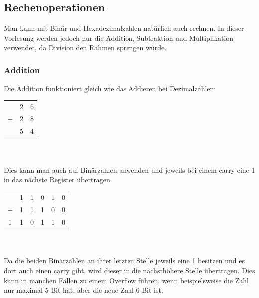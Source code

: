 \documentclass{article}
\begin{document}
	\subsection{Rechenoperationen}
		Man kann mit Binär und Hexadezimalzahlen natürlich auch rechnen. In dieser Vorlesung werden jedoch nur die Addition, Subtraktion und Multiplikation verwendet, da Division den Rahmen sprengen würde. \\
		\subsubsection{Addition}
			Die Addition funktioniert gleich wie das Addieren bei Dezimalzahlen: \\
			\begin{tabular}{ccc}
				 &2&6 \\ 
				+&2&8 \\ \midrule
				 &5&4 \\
			\end{tabular} \\ \\
			Dies kann man auch auf Binärzahlen anwenden und jeweils bei einem carry eine 1 in das nächste Register übertragen. \\
			\begin{tabular}{cccccc}
				 &1&1&0&1&0 \\
				+&1&1&1&0&0 \\ \midrule
				1&1&0&1&1&0 \\
			\end{tabular} \\ \\
			Da die beiden Binärzahlen an ihrer letzten Stelle jeweils eine 1 besitzen und es dort auch einen carry gibt, wird dieser in die nächsthöhere Stelle übertragen. Dies kann in manchen Fällen zu einem Overflow führen, wenn beispielsweise die Zahl nur maximal 5 Bit hat, aber die neue Zahl 6 Bit ist. \\
\end{document}
